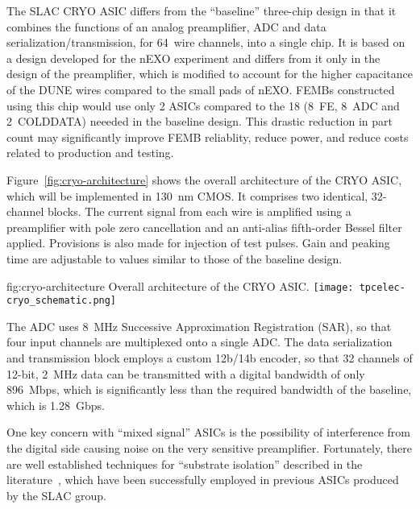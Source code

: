 The SLAC CRYO ASIC differs from the ``baseline'' three-chip design in that it combines the functions of an analog preamplifier, ADC and data serialization/transmission, for 64~wire channels, into a single chip.
It is based on a design developed for the nEXO experiment and differs from it only in the design of the preamplifier, which is modified to account for the higher capacitance of the DUNE wires compared to the small pads of nEXO.
FEMBs constructed using this chip would use only 2 ASICs compared to the 18 (8~FE, 8~ADC and 2~COLDDATA) neeeded in the baseline design.
This drastic reduction in part count may significantly improve FEMB reliablity, reduce power, and reduce costs related to production and testing. 

Figure~\ref{fig:cryo-architecture} shows the overall architecture of the CRYO ASIC, which will be implemented in 130~nm CMOS.
It comprises two identical, 32-channel blocks. 
The current signal from each wire is amplified using a preamplifier with pole zero cancellation and an anti-alias fifth-order Bessel filter applied. 
Provisions is also made for injection of test pulses. 
Gain and peaking time are adjustable to values similar to those of the baseline design.

\begin{dunefigure}
{fig:cryo-architecture}
{Overall architecture of the CRYO ASIC.}
\texttt{[image: tpcelec-cryo\_schematic.png]}
\end{dunefigure}

The ADC uses 8~MHz Successive Approximation Registration (SAR), so that four input channels are multiplexed onto a single ADC. The data serialization and transmission block employs a custom 12b/14b encoder, so that 32 channels of 12-bit, 2~MHz data can be transmitted with a digital bandwidth of only 896~Mbps, which is significantly less than the required bandwidth of the baseline, which is 1.28~Gbps.

One key concern with ``mixed signal'' ASICs is the possibility of interference from the digital side causing noise on the very sensitive preamplifier. 
Fortunately, there are well established techniques for ``substrate isolation'' described in the literature~\cite{yeh}, which have been successfully employed in previous ASICs produced by the SLAC group.%


